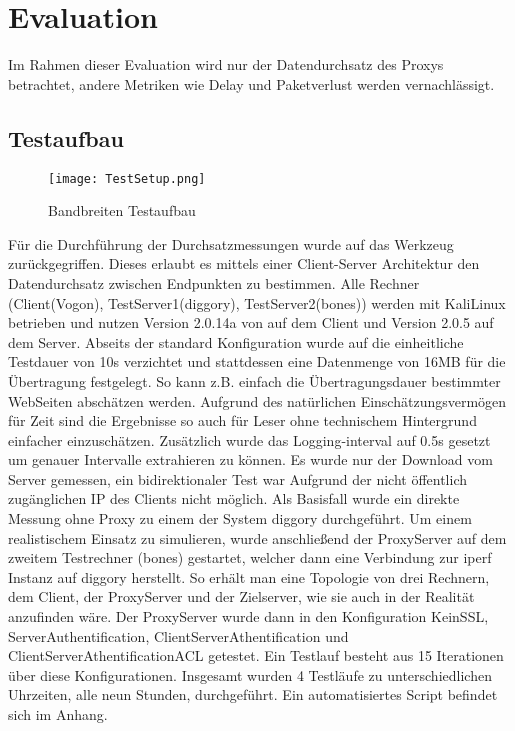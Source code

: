 \documentclass[12pt, a4paper]{scrartcl}
\begin{document}
\section{Evaluation}
Im Rahmen dieser Evaluation wird nur der Datendurchsatz des Proxys betrachtet, andere Metriken wie Delay und Paketverlust werden vernachlässigt.
\subsection{Testaufbau}
\begin{figure}
    \centering
    \texttt{[image: TestSetup.png]}
    \caption{Bandbreiten Testaufbau}
    \label{fig::test}
\end{figure}
Für die Durchführung der Durchsatzmessungen wurde auf das Werkzeug  zurückgegriffen. Dieses erlaubt es mittels einer Client-Server Architektur den Datendurchsatz zwischen Endpunkten zu bestimmen.\newline
Alle Rechner (Client(Vogon), TestServer1(diggory), TestServer2(bones)) werden mit KaliLinux betrieben und nutzen Version 2.0.14a von  auf dem Client und Version 2.0.5 auf dem Server. Abseits der standard Konfiguration wurde auf die einheitliche Testdauer von 10s verzichtet und stattdessen eine Datenmenge von 16MB für die Übertragung festgelegt. So kann z.B. einfach die Übertragungsdauer bestimmter WebSeiten abschätzen werden. Aufgrund des natürlichen Einschätzungsvermögen für Zeit sind die Ergebnisse so auch für Leser ohne technischem Hintergrund einfacher einzuschätzen. Zusätzlich wurde das Logging-interval auf 0.5s gesetzt um genauer Intervalle extrahieren zu können. Es wurde nur der Download vom Server gemessen, ein bidirektionaler Test war Aufgrund der nicht öffentlich zugänglichen IP des Clients nicht möglich.\newline
Als Basisfall wurde ein direkte Messung ohne Proxy zu einem der System diggory durchgeführt. Um einem realistischem Einsatz zu simulieren, wurde anschließend der ProxyServer auf dem zweitem Testrechner (bones) gestartet, welcher dann eine Verbindung zur iperf Instanz auf diggory herstellt. So erhält man eine Topologie von drei Rechnern, dem Client, der ProxyServer und der Zielserver, wie sie auch in der Realität anzufinden wäre.\newline
Der ProxyServer wurde dann in den Konfiguration KeinSSL, ServerAuthentification, ClientServerAthentification und ClientServerAthentificationACL getestet. Ein Testlauf besteht aus 15 Iterationen über diese Konfigurationen. Insgesamt wurden 4 Testläufe zu unterschiedlichen Uhrzeiten, alle neun Stunden, durchgeführt. Ein automatisiertes Script befindet sich im Anhang.
\end{document}
